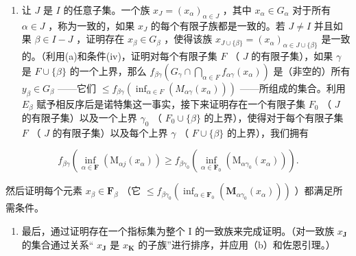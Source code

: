 \begin{enumerate}
\def\labelenumi{(\alph{enumi})}
\setcounter{enumi}{1}
\tightlist
\item
  让 \(J\) 是 \(I\) 的任意子集。一个族 \(x_{J} = (x_{\alpha})_{\alpha \in J}\) ，其中 \(x_{\alpha} \in G_{\alpha}\) 对于所有 \(\alpha \in J\) ，称为一致的，如果 \(x_{J}\) 的每个有限子族都是一致的。若 \(J \neq I\) 并且如果 \(\beta \in I - J\) ，证明存在 \(x_{\beta} \in G_{\beta}\) ，使得该族 \(x_{J \cup \{\beta\}} = (x_{\alpha})_{\alpha \in J \cup \{\beta\}}\) 是一致的。（利用(a)和条件(iv)，证明对每个有限子集 \(F\) （ \(J\) 的有限子集），如果 \(\gamma\) 是 \(F \cup \{\beta\}\) 的一个上界，那么 \(f_{\beta \gamma} \left( G_{\gamma} \cap \bigcap_{\alpha \in F} f_{\alpha \gamma}(x_{\alpha}) \right)\) 是（非空的）所有 \(y_{\beta} \in G_{\beta}\) ——它们 \(\leqslant f_{\beta \gamma} \left( \inf_{\alpha \in F} (M_{\alpha \gamma}(x_{\alpha})) \right)\) ——所组成的集合。利用 \(E_{\beta}\) 赋予相反序后是诺特集这一事实，接下来证明存在一个有限子集 \(F_0\) （ \(J\) 的有限子集）以及一个上界 \(\gamma_0\) （ \(F_0 \cup \{\beta\}\) 的上界），使得对于每个有限子集 \(F\) （ \(J\) 的有限子集）以及每个上界 \(\gamma\) （ \(F \cup \{\beta\}\) 的上界），我们拥有
\end{enumerate}

\[
f _ {\beta \gamma} \left( \right.\inf _ {\alpha \in \mathbf {F}} \left(\mathrm{M} _ {\alpha j} (x _ {\alpha})\right) \geqslant f _ {\beta \gamma_ {0}} \left(\inf _ {\alpha \in \mathbf {F} _ {0}} \left(\mathrm{M} _ {\alpha \gamma_ {0}} (x _ {\alpha})\right)\right).
\]

然后证明每个元素 \(x_{\beta} \in \mathbf{F}_{\beta}\) （它 \(\leqslant f_{\beta \gamma_0} \left( \inf_{\alpha \in \mathbf{F}_0} (\mathbf{M}_{\alpha \gamma_0}(x_\alpha)) \right)\) ）都满足所需条件。

\begin{enumerate}
\def\labelenumi{(\alph{enumi})}
\setcounter{enumi}{2}
\tightlist
\item
  最后，通过证明存在一个指标集为整个 I 的一致族来完成证明。（对一致族 \(x_{\mathbf{J}}\) 的集合通过关系“ \(x_{\mathbf{J}}\) 是 \(x_{\mathbf{K}}\) 的子族''进行排序，并应用（b）和佐恩引理。）
\end{enumerate}

